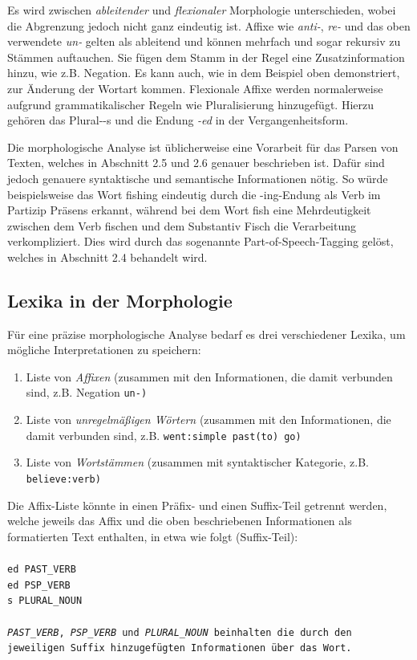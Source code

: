 \documentclass[12pt]{report}
\begin{document}
Es wird zwischen \textit{ableitender} und \textit{flexionaler} Morphologie unterschieden, wobei die Abgrenzung jedoch nicht ganz eindeutig ist. Affixe wie \textit{\glqq  anti-\grqq{}}, \textit{\glqq  re-\grqq{}} und das oben verwendete \textit{\glqq  un-\grqq{}} gelten als ableitend und können mehrfach und sogar rekursiv zu Stämmen auftauchen. Sie fügen dem Stamm in der Regel eine Zusatzinformation hinzu, wie z.B. Negation. Es kann auch, wie in dem Beispiel oben demonstriert, zur Änderung der Wortart kommen. Flexionale Affixe werden normalerweise aufgrund grammatikalischer Regeln wie Pluralisierung hinzugefügt. Hierzu gehören das Plural-\glqq  -s\grqq{} und die Endung \textit{\glqq  -ed\grqq{}} in der Vergangenheitsform. 

Die morphologische Analyse ist üblicherweise eine Vorarbeit für das Parsen von Texten, welches in Abschnitt 2.5 und 2.6 genauer beschrieben ist. Dafür sind jedoch genauere syntaktische und semantische Informationen nötig. So würde beispielsweise das Wort \glqq  fishing\grqq{} eindeutig durch die \glqq  -ing\grqq{}-Endung als Verb im Partizip Präsens erkannt, während bei dem Wort \glqq  fish\grqq{} eine Mehrdeutigkeit zwischen dem Verb \glqq  fischen\grqq{} und dem Substantiv \glqq  Fisch\grqq{} die Verarbeitung verkompliziert. Dies wird durch das sogenannte Part-of-Speech-Tagging gelöst, welches in Abschnitt 2.4 behandelt wird.

\subsection{Lexika in der Morphologie}
Für eine präzise morphologische Analyse bedarf es drei verschiedener Lexika, um mögliche Interpretationen zu speichern:

\begin{enumerate}
\item Liste von \textit{Affixen} (zusammen mit den Informationen, die damit verbunden sind, z.B. Negation \tt \glqq  un-\grqq{}\rm)
\item Liste von \textit{unregelmäßigen Wörtern} (zusammen mit den Informationen, die damit verbunden sind, z.B. \tt \glqq  went\grqq{}:simple past\glqq  (to) go\grqq{}\rm)
\item Liste von \textit{Wortstämmen} (zusammen mit syntaktischer Kategorie, z.B. \tt \glqq  believe\grqq{}:verb\rm)
\end{enumerate}

Die Affix-Liste könnte in einen Präfix- und einen Suffix-Teil getrennt werden, welche jeweils das Affix und die oben beschriebenen Informationen als formatierten Text enthalten, in etwa wie folgt (Suffix-Teil):
\\
\tt\\
ed PAST\_VERB\\
ed PSP\_VERB\\
s PLURAL\_NOUN\\
\rm\\
\textit{PAST\_VERB}, \textit{PSP\_VERB} und \textit{PLURAL\_NOUN} beinhalten die durch den jeweiligen Suffix hinzugefügten Informationen über das Wort. 
\end{document}
